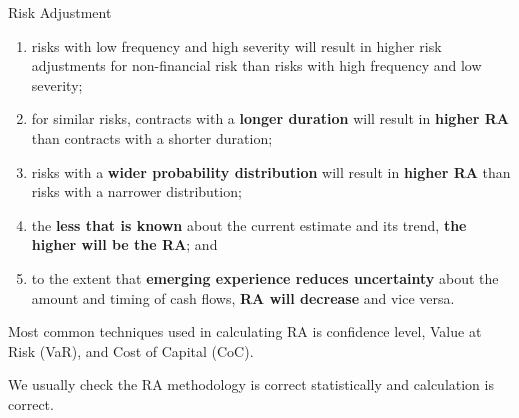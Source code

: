 \documentclass[aspectratio=169]{beamer}
\begin{document}
\begin{frame}[allowframebreaks]{Risk Adjustment}
\begin{enumerate} 
\item risks with low frequency and high severity will result in higher risk adjustments for non-financial risk than risks with high frequency and low severity;
\item for similar risks, contracts with a \textbf{longer duration} will result in \textbf{higher RA} than contracts with a shorter duration;
\item risks with a \textbf{wider probability distribution} will result in \textbf{higher RA} than risks with a narrower distribution;
\item the \textbf{less that is known} about the current estimate and its trend, \textbf{the higher will be the RA}; and
\item to the extent that \textbf{emerging experience reduces uncertainty} about the amount and timing of cash flows, \textbf{RA will decrease} and vice versa.
\end{enumerate}
Most common techniques used in calculating RA is confidence level, Value at Risk (VaR), and Cost of Capital (CoC).
\begin{tcolorbox}[colback=green!5,colframe=green!40!black,title=Audit Checkbox]
We usually check the RA methodology is correct statistically and calculation is correct. 
\end{tcolorbox}
\end{frame} 
\end{document}
